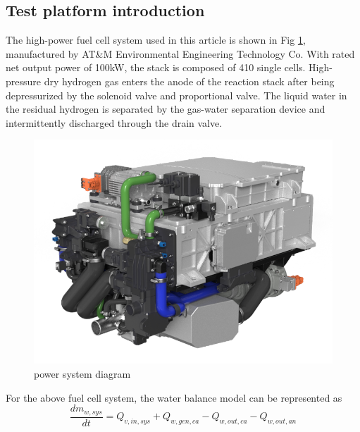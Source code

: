 \subsection{Test platform introduction}
The high-power fuel cell system used in this article is shown in Fig \ref{fig:PowerSystemDiagram}, manufactured by AT\&M Environmental Engineering Technology Co. With rated net output power of 100kW, the stack is composed of 410 single cells. High-pressure dry hydrogen gas enters the anode of the reaction stack after being depressurized by the solenoid valve and proportional valve. The liquid water in the residual hydrogen is separated by the gas-water separation device and intermittently discharged through the drain valve.
\begin{figure}[h]
	\centering
	\label{fig:PowerSystemDiagram}
	\includegraphics[scale=0.4]{Research_pictures/picture2.png}
	\caption[short]{power system diagram}
\end{figure}

For the above fuel cell system, the water balance model can be represented as
\begin{equation} \label{waterBalanceModel}
	\frac{d m_{w,s y s}}{d t}=Q_{v,i n,s y s}+Q_{w,g e n,c a}-Q_{w,o u t,c a}-Q_{w,o u t,a n}
\end{equation}

